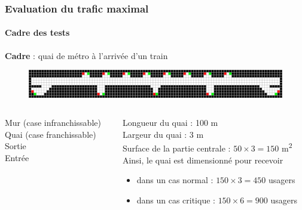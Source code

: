 \begin{frame}
    \frametitle{Evaluation du trafic maximal}
    \framesubtitle{Cadre des tests}

    \textbf{Cadre} : quai de métro à l'arrivée d'un train \\[.3cm]

    \begin{figure}
        \includegraphics[width=1\textwidth]{figures/Fig05}

    \end{figure}

    \begin{columns}
        \begin{column}{0.35\textwidth}
            \tiny{\quad Mur (case infranchissable) \\
            \quad Quai (case franchissable) \\
            \quad Sortie \\
            \quad Entrée \\}
        \end{column}

        \begin{column}{0.7\textwidth}
                 Longueur du quai : \num{100} \si{\metre} \\
                 Largeur du quai : \num{3} \si{\metre}  \\
                \bigskip
                 Surface de la partie centrale : $50 \times 3 = 150$ \si{\metre \squared}   \\[.5cm]
                 Ainsi, le quai est dimensionné pour recevoir
            \begin{itemize}
                \item <6-> dans un cas normal : $150 \times 3 = 450$ usagers
                \item <7-> dans un cas critique : $150 \times 6 = 900$ usagers
            \end{itemize}

        \end{column}
    \end{columns}
\end{frame}




